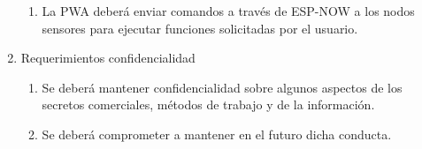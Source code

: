\begin{enumerate}
\begin{enumerate}
			\item La PWA deberá enviar comandos a través de ESP-NOW a los nodos sensores para ejecutar funciones solicitadas por el usuario.
		\end{enumerate}
	\item Requerimientos confidencialidad
		\begin{enumerate}
			\item Se deberá mantener confidencialidad sobre algunos aspectos de los secretos comerciales, métodos de trabajo y de la información.
			\item Se deberá comprometer a mantener en el futuro dicha conducta.
		\end{enumerate}
\end{enumerate}